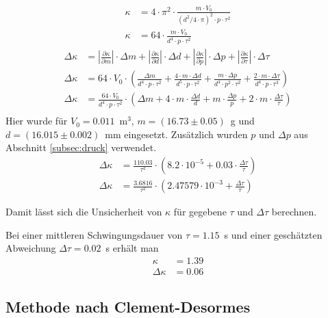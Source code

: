 \documentclass{article}
\begin{document}
\begin{align}
\kappa &= 4\cdot \pi^2 \cdot \frac{m\cdot V_0}{\left(d^2/4\cdot \pi\right)^2\cdot p\cdot \tau^2} \\
\kappa &= 64\cdot \frac{m\cdot V_0}{d^4\cdot p\cdot \tau^2} 
\end{align}
\begin{align}
\Delta \kappa &= \left| \frac{\partial \kappa}{\partial m} \right| \cdot \Delta m + \left| \frac{\partial \kappa}{\partial d} \right| \cdot \Delta d + \left| \frac{\partial \kappa}{\partial p} \right| \cdot \Delta p + \left| \frac{\partial \kappa}{\partial \tau} \right| \cdot \Delta \tau \\
\Delta \kappa &= 64\cdot V_0\cdot  \left( \frac{\Delta m}{d^4\cdot p\cdot \tau^2} + \frac{4\cdot m\cdot\Delta d}{d^5\cdot p\cdot \tau^2} + \frac{m\cdot \Delta p}{d^4\cdot p^2\cdot \tau^2} + \frac{2\cdot m\cdot\Delta\tau}{d^4\cdot p\cdot \tau^3} \right) \\
\Delta \kappa &= \frac{64\cdot V_0}{d^4\cdot p\cdot \tau^2}\cdot \left( \Delta m + 4\cdot m\cdot \frac{\Delta d}{d} + m\cdot \frac{\Delta p}{p} + 2\cdot m\cdot \frac{\Delta \tau}{\tau}\right) \\
\end{align}
Hier wurde für $V_0 = 0.011$~m${}^3$, $m=(16.73\pm0.05)$~g und $d=(16.015\pm0.002)$~mm eingesetzt. Zusätzlich wurden $p$ und $\Delta p$ aus Abschnitt \ref{subsec:druck} verwendet.
\begin{align}
\Delta \kappa &= \frac{110.03}{\tau^2}\cdot \left(8.2\cdot 10^{-5} + 0.03\cdot \frac{\Delta \tau}{\tau}\right) \\
\Delta \kappa &= \frac{3.6816}{\tau^2}\cdot \left(2.47579\cdot 10^{-3} + \frac{\Delta \tau}{\tau}\right)
\end{align}

Damit lässt sich die Unsicherheit von $\kappa$ für gegebene $\tau$ und $\Delta \tau$ berechnen.

Bei einer mittleren Schwingungsdauer von $\tau=1.15$~s und einer geschätzten Abweichung $\Delta \tau = 0.02$~s erhält man
\begin{align}
\kappa &= 1.39 \\
\Delta \kappa &= 0.06
\end{align}



\subsection{Methode nach Clement-Desormes}
\end{document}
